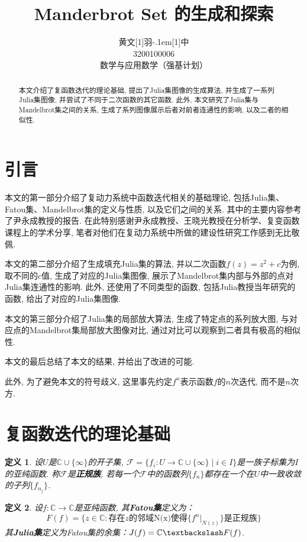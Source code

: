 \documentclass[UTF8]{ctexart}
\title{\textbf{Manderbrot Set 的生成和探索}}
\date{}
\author{\CJKfamily{kai} 黄文\hbox{\scalebox{0.6}[1]{羽}\kern-.1em\scalebox{0.5}[1]{中}}\\3200100006\\数学与应用数学（强基计划）}
\newtheorem{definition}{定义}
\begin{document}
\maketitle

\begin{abstract}
     本文介绍了复函数迭代的理论基础, 提出了Julia集图像的生成算法, 并生成了一系列Julia集图像, 并尝试了不同于二次函数的其它函数. 此外, 本文研究了Julia集与Mandelbrot集之间的关系, 生成了系列图像展示后者对前者连通性的影响, 以及二者的相似性.
\end{abstract}

\section{引言}

本文的第一部分介绍了复动力系统中函数迭代相关的基础理论, 包括Julia集、Fatou集、Mandelbrot集的定义与性质, 以及它们之间的关系. 其中的主要内容参考了尹永成教授的报告. 在此特别感谢尹永成教授、王晓光教授在分析学、复变函数课程上的学术分享, 笔者对他们在复动力系统中所做的建设性研究工作感到无比敬佩. 

本文的第二部分介绍了生成填充Julia集的算法, 并以二次函数$f(z)=z^2+c$为例, 取不同的$c$值, 生成了对应的Julia集图像, 展示了Mandelbrot集内部与外部的点对Julia集连通性的影响. 此外, 还使用了不同类型的函数, 包括Julia教授当年研究的函数, 给出了对应的Julia集图像. 

本文的第三部分介绍了Julia集的局部放大算法, 生成了特定点的系列放大图, 与对应点的Mandelbrot集局部放大图像对比, 通过对比可以观察到二者具有极高的相似性. 

本文的最后总结了本文的结果, 并给出了改进的可能. 

此外, 为了避免本文的符号歧义, 这里事先约定$f^n$表示函数$f$的$n$次迭代, 而不是$n$次方. 

\section{复函数迭代的理论基础}

\begin{definition}
    设$U$是$\mathbb{C}\cup\{\infty\}$的开子集, $\mathcal{F}=\{f_i:U\to \mathbb{C}\cup\{\infty\}\;|\; i\in I\}$是一族子标集为$I$的亚纯函数. 称$\mathcal{F}$是\textbf{正规族}, 若每一个$\mathcal{F}$中的函数列$\{f_n\}$都存在一个在$U$中一致收敛的子列$\{f_{n_j}\}$. \cite{2014Fractals}
\end{definition}

\begin{definition}
    设$f:\mathbb{C}\to\mathbb{C}$是亚纯函数, 其\textbf{Fatou集}定义为：
    \begin{equation*}
        F(f)=\{z\in\mathbb{C}:\text{存在}z\text{的邻域N(x)使得}\{f^n|_{N(z)}\}\text{是正规族}\}
    \end{equation*}
    其\textbf{Julia集}定义为Fatou集的余集：$J(f)=\mathbb{C}\textbackslash F(f)$. \cite{2014Fractals}
\end{definition}
\end{document}
